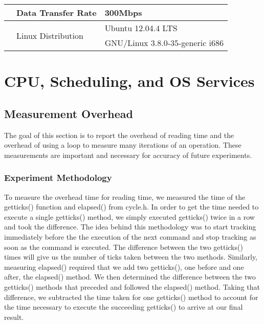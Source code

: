 \documentclass{article} %
\begin{document}
\begin{table}[h]
\begin{center}
{\begin{tabular}{|>{\centering\arraybackslash\bfseries}m{1in}|l|l|}
	                                                                      & Data Transfer Rate                    & 300Mbps                                                        \\
	\hline
	\multicolumn{1}{|>{\bfseries}c|}{\multirow{2}{*}{OS}}                 & \multirow{2}{*}{ Linux Distribution } & Ubuntu 12.04.4 LTS                                             \\
	                                                                      & \multicolumn{1}{c|}{}                 & GNU/Linux 3.8.0-35-generic i686                                \\
	\hline
  \end{tabular}
} %
  \end{center}
  \label{table:machine_description}
\end{table}


\section{CPU, Scheduling, and OS Services}

\subsection{Measurement Overhead}
The goal of this section is to report the overhead of reading time and the overhead of using a loop to measure many iterations of an operation. These measurements are important and necessary for accuracy of future experiments. 

\subsubsection{Experiment Methodology}
To measure the overhead time for reading time, we measured the time of the getticks() function and elapsed() from cycle.h. In order to get the time needed to execute a single getticks() method, we simply executed getticks() twice in a row and took the difference. The idea behind this methodology was to start tracking immediately before the the execution of the next command and stop tracking as soon as the command is executed. The difference between the two getticks() times will give us the number of ticks taken between the two methods. Similarly, measuring elapsed() required that we add two getticks(), one before and one after, the elapsed() method. We then determined the difference between the two getticks() methods that preceded and followed the elapsed() method. Taking that difference, we subtracted the time taken for one getticks() method to account for the time necessary to execute the succeeding getticks() to arrive at our final result. 
  
\end{document}
